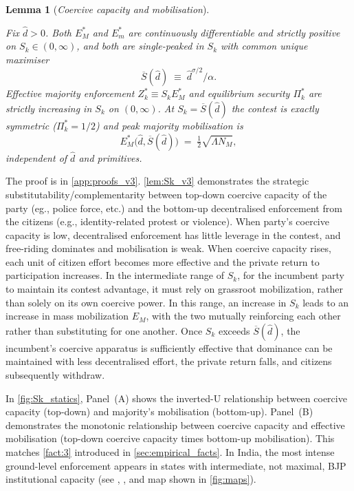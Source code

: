 \documentclass[11pt,twoside]{extarticle}
\newtheorem{lemma}{Lemma}
\begin{document}
\begin{lemma}[\emph{Coercive capacity and mobilisation}]\label{lem:Sk_v3}

Fix $\hat d>0$. Both $E_M^*$ and $E_m^*$ are continuously differentiable and strictly positive on $S_k\in(0,\infty)$, and both are single-peaked in $S_k$ with common unique maximiser
\begin{equation}\label{eq:Sk_threshold_v3}
    \overline S(\hat d)\;\equiv\;\hat d^{\sigma/2}/\alpha.
\end{equation}
Effective majority enforcement $Z_k^*\equiv S_k E_M^*$ and equilibrium security $\Pi_k^*$ are strictly increasing in $S_k$ on $(0,\infty)$. At $S_k=\overline S(\hat d)$ the contest is exactly symmetric ($\Pi_k^*=1/2$) and peak majority mobilisation is
\begin{equation}\label{eq:EM_peak_v3}
    E_M^*\big(\hat d,\overline S(\hat d)\big)\;=\;\tfrac12\sqrt{\Lambda N_M},
\end{equation}
independent of $\hat d$ and primitives.
\end{lemma}

The proof is in \autoref{app:proofs_v3}.
\autoref{lem:Sk_v3} demonstrates the strategic substitutability/complementarity between top-down coercive capacity of the party (eg., police force, etc.) and the bottom-up decentralised enforcement from the citizens (e.g., identity-related protest or violence). When party's coercive capacity is low, decentralised enforcement has little leverage in the contest, and free-riding dominates and mobilisation is weak. When coercive capacity rises, each unit of citizen effort becomes more effective and the private return to participation increases. In the intermediate range of $S_k$, for the incumbent party to maintain its contest advantage, it must rely on grassroot mobilization, rather than solely on its own coercive power. In this range, an increase in $S_k$ leads to an increase in mass mobilization $E_M$, with the two mutually reinforcing each other rather than substituting for one another. Once $S_k$ exceeds $\overline S(\hat d)$, the incumbent's coercive apparatus is sufficiently effective that dominance can be maintained with less decentralised effort, the private return falls, and citizens subsequently withdraw. 

In \autoref{fig:Sk_statics}, Panel~(A) shows the inverted-U relationship between coercive capacity (top-down) and majority's mobilisation (bottom-up). Panel~(B) demonstrates the monotonic relationship between coercive capacity and effective mobilisation (top-down coercive capacity times bottom-up mobilisation). This matches \autoref{fact:3} introduced in \autoref{sec:empirical_facts}. In India, the most intense ground-level enforcement appears in states with intermediate, not maximal, BJP institutional capacity (see \citet*{jaffrelotModisIndiaHindu2021}, \citet*{mitraImplicationsEconomicTheory2014}, and map shown in \autoref{fig:maps}).
\end{document}
